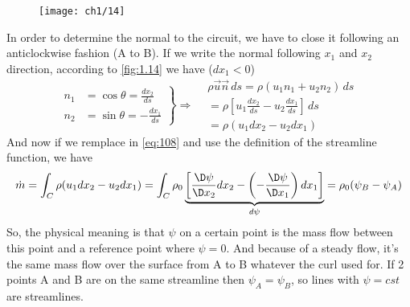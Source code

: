 			\begin{wrapfigure}[7]{r}{4.5cm}
			\vspace{-5mm}
			\texttt{[image: ch1/14]}
			\label{fig:1.14}
			\end{wrapfigure}
			In order to determine the normal to the circuit, we have to close it following an anticlockwise fashion (A to B). If we write the normal following $x_1$ and $x_2$ direction, according to \autoref{fig:1.14} we have ($dx_1<0$)
			\begin{equation}
			\left.
			\begin{aligned}
				n_1 &= \cos \theta = \frac{dx_2}{ds} \\
				n_2 &= \sin \theta = -\frac{dx_1}{ds}
			\end{aligned}
			\right\}
			 \Rightarrow 
			\begin{aligned}
				&\rho \vec{u}\vec{n}\,  ds = \rho (u_1 n_1 + u_2 n_2)\, ds\\
				&= \rho \left[ u_1 \frac{dx_2}{ds} - u_2 \frac{dx_1}{ds} \right]\, ds\\
				&= \rho (u_1 dx_2 - u_2 dx_1)
			\end{aligned}
			\label{eq:1.109}
			\end{equation}
			And now if we remplace in \eqref{eq:108} and use the definition of the streamline function, we have 
			\begin{equation}
				\dot{m} = \int _C \rho (u_1 dx_2 - u_2 dx_1) = \int _C \rho _0 \underbrace{\left[\frac{\D \psi }{\D x_2}dx_2 - \left( -\frac{\D \psi}{\D x_1} \right) dx_1 \right]}_{d\psi} = \rho _0 (\psi _B - \psi _A)
			\end{equation}
			So, the physical meaning is that $\psi$ on a certain point is the mass flow between this point and a reference point where $\psi = 0$. And because of a steady flow, it's the same mass flow over the surface from A to B whatever the curl used for. If 2 points A and B are on the same streamline then $\psi_A = \psi _B$, so lines with $\psi = cst$ are streamlines. 
			

